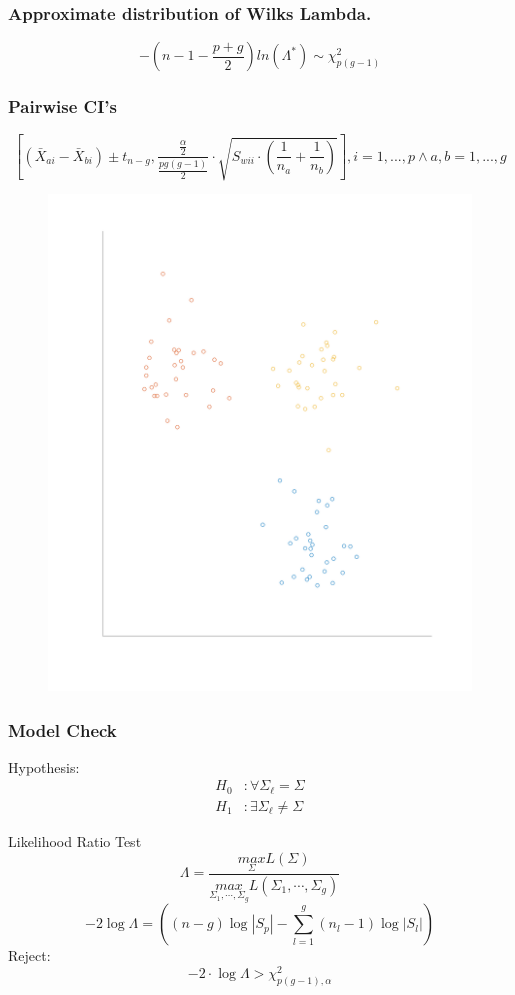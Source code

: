 \documentclass[aspectratio=169,10pt,t]{beamer}
\begin{document}
\begin{frame}[t]
	\frametitle{Approximate distribution of Wilks Lambda.}
	\[
		-\left(n-1-\frac{p+g}{2}\right)ln\left( \Lambda^*\right) \sim \chi^2_{p(g-1)}
	\]  
\end{frame}

\begin{frame}[t]
	\frametitle{Pairwise CI's}
	\[
		\left[
			( \bar{X}_{ai} - \bar{X}_{bi}  ) 
			\pm t_{n-g},
			\frac{\frac{\alpha }{2}}{ \frac{pg(g-1)}{2} } \cdot 
			\sqrt{S_{wii} \cdot \left(  \frac{1}{n_a} + \frac{1}{n_b}  \right) }
	\right] , i = 1,...,p \land a,b = 1,...,g
	\] 

	\begin{figure}[H]
		\includegraphics[scale=0.2]{clusters.png}
	\end{figure}
\end{frame}


\begin{frame}[t]
	\frametitle{Model Check}
	Hypothesis:
	\[
		\begin{aligned}
			H_0 &: \forall \Sigma_\ell = \Sigma\\
			H_1 &: \exists \Sigma_\ell \neq \Sigma
		\end{aligned}
	\] 

	Likelihood Ratio Test
	\[
		\Lambda = \frac{\underset{\Sigma}{max}L(\Sigma)}{\underset{\Sigma_1,\cdots,\Sigma_g}{max}L(\Sigma_1,\cdots,\Sigma_g)} 
	\] 
	\[
		-2\log\Lambda =  \left((n-g)\log|S_p| - \sum^{g}_{l=1}(n_l - 1) \log|S_l| \right) 
	\]
	Reject:
	\[
        -2 \cdot \log\Lambda > \chi^2_{p (g-1), \alpha}
	\] 

\end{frame}
\end{document}
